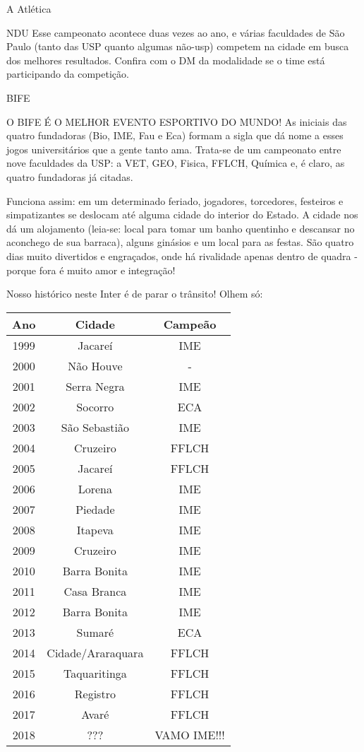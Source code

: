 \begin{secao}{A Atlética}
\begin{subsecao}{NDU}
Esse campeonato acontece duas vezes ao ano, e várias faculdades de São Paulo
(tanto das USP quanto algumas não-usp) competem na cidade em busca dos melhores
resultados. Confira com o DM da modalidade se o time está participando da
competição.

\end{subsecao}
\begin{subsecao}{BIFE}

O BIFE É O MELHOR EVENTO ESPORTIVO DO MUNDO! As iniciais das quatro fundadoras
(Bio, IME, Fau e Eca) formam a sigla que dá nome a esses jogos universitários
que a gente tanto ama. Trata-se de um campeonato entre nove faculdades da USP:
a VET, GEO, Fisica, FFLCH, Química e, é claro, as quatro fundadoras já citadas.

Funciona assim: em um determinado feriado, jogadores, torcedores, festeiros e
simpatizantes se deslocam até alguma cidade do interior do Estado. A cidade nos
dá um alojamento (leia-se: local para tomar um banho quentinho e descansar no
aconchego de sua barraca), alguns ginásios e um local para as festas. São
quatro dias muito divertidos e engraçados, onde há rivalidade apenas dentro de
quadra - porque fora é muito amor e integração!

Nosso histórico neste Inter é de parar o trânsito! Olhem só:

\begin{center}
  \begin{tabular}{c|c|c}
   Ano & Cidade & Campeão\\
   \hline
   1999 & Jacareí & IME\\
   2000 & Não Houve & - \\
   2001 & Serra Negra & IME\\
   2002 & Socorro & ECA\\
   2003 & São Sebastião & IME\\
   2004 & Cruzeiro & FFLCH\\
   2005 & Jacareí & FFLCH\\
   2006 & Lorena & IME\\
   2007 & Piedade & IME\\
   2008 & Itapeva & IME\\
   2009 & Cruzeiro & IME\\
   2010 & Barra Bonita & IME\\
   2011 & Casa Branca & IME\\
   2012 & Barra Bonita & IME\\
   2013 & Sumaré & ECA\\
   2014 & Cidade/Araraquara & FFLCH\\
   2015 & Taquaritinga & FFLCH\\
   2016 & Registro & FFLCH\\
   2017 & Avaré & FFLCH\\
   2018 & ??? & VAMO IME!!!
  \end{tabular}
\end{center}


\end{subsecao}
\end{secao}
